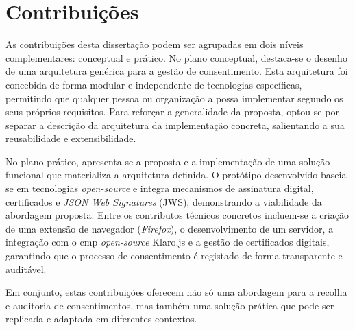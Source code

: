 
\section{Contribuições}

As contribuições desta dissertação podem ser agrupadas em dois níveis complementares: conceptual e prático. 
No plano conceptual, destaca-se o desenho de uma arquitetura genérica para a gestão de consentimento. Esta arquitetura foi concebida de forma modular e independente de tecnologias específicas, permitindo que qualquer pessoa ou organização a possa implementar segundo os seus próprios requisitos. Para reforçar a generalidade da proposta, optou-se por separar a descrição da arquitetura da implementação concreta, salientando a sua reusabilidade e extensibilidade.

No plano prático, apresenta-se a proposta e a implementação de uma solução funcional que materializa a arquitetura definida. O protótipo desenvolvido baseia-se em tecnologias \textit{open-source} e integra mecanismos de assinatura digital, certificados e \textit{JSON Web Signatures} (JWS), demonstrando a viabilidade da abordagem proposta. Entre os contributos técnicos concretos incluem-se a criação de uma extensão de navegador (\textit{Firefox}), o desenvolvimento de um servidor, a integração com o \acrshort{cmp} \textit{open-source} Klaro.js e a gestão de certificados digitais, garantindo que o processo de consentimento é registado de forma transparente e auditável.

Em conjunto, estas contribuições oferecem não só uma abordagem para a recolha e auditoria de consentimentos, mas também uma solução prática que pode ser replicada e adaptada em diferentes contextos.

